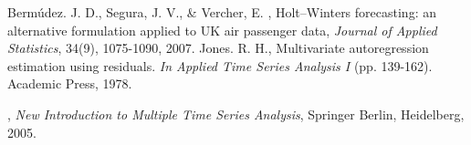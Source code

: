 \documentclass[13pt]{report}
\numberwithin{equation}{section}
\begin{document}
\begin{thebibliography}{99}\rm
{}
 Bermúdez. J. D., Segura, J. V., \& Vercher, E. , Holt–Winters forecasting: an alternative formulation applied to UK air passenger data, \textit{Journal of Applied Statistics}, 34(9), 1075-1090, 2007.
 Jones. R. H.,  Multivariate autoregression estimation using residuals. \textit{In Applied Time Series Analysis I} (pp. 139-162). Academic Press, 1978.

 , \textit{New Introduction to Multiple Time Series Analysis}, Springer Berlin, Heidelberg, 2005.

\end{thebibliography}


	
\end{document}
